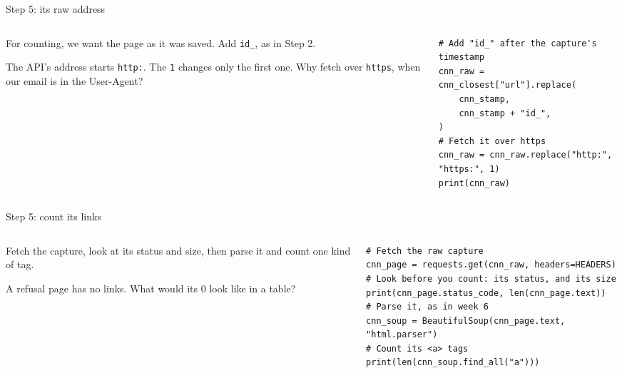 \documentclass[9pt,aspectratio=169]{beamer}
\begin{document}
\begin{frame}[fragile]{Step 5: its raw address}
    \begin{columns}[T]
        \begin{column}{0.37\textwidth}
            For counting, we want the page as it was saved. Add \texttt{id\_}, as in Step 2.

            \medskip
            The API's address starts \texttt{http:}. The \texttt{1} changes only the first one. Why fetch over \texttt{https}, when our email is in the User-Agent?
        \end{column}
        \begin{column}{0.6\textwidth}
\begin{lstlisting}
# Add "id_" after the capture's timestamp
cnn_raw = cnn_closest["url"].replace(
    cnn_stamp,
    cnn_stamp + "id_",
)
# Fetch it over https
cnn_raw = cnn_raw.replace("http:", "https:", 1)
print(cnn_raw)
\end{lstlisting}
        \end{column}
    \end{columns}
\end{frame}

\begin{frame}[fragile]{Step 5: count its links}
    \begin{columns}[T]
        \begin{column}{0.37\textwidth}
            Fetch the capture, look at its status and size, then parse it and count one kind of tag.

            \medskip
            A refusal page has no links. What would its 0 look like in a table?
        \end{column}
        \begin{column}{0.6\textwidth}
\begin{lstlisting}
# Fetch the raw capture
cnn_page = requests.get(cnn_raw, headers=HEADERS)
# Look before you count: its status, and its size
print(cnn_page.status_code, len(cnn_page.text))
# Parse it, as in week 6
cnn_soup = BeautifulSoup(cnn_page.text, "html.parser")
# Count its <a> tags
print(len(cnn_soup.find_all("a")))
\end{lstlisting}
        \end{column}
    \end{columns}
\end{frame}
\end{document}
